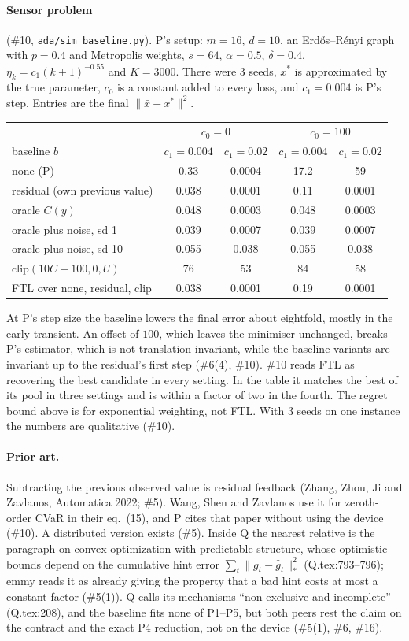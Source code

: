 \documentclass{article}
\begin{document}
\paragraph{Sensor problem} (\#10, \texttt{ada/sim\_baseline.py}). P's
setup: $m=16$, $d=10$, an Erd\H{o}s--R\'enyi graph with $p=0.4$ and
Metropolis weights, $s=64$, $\alpha=0.5$, $\delta=0.4$,
$\eta_k=c_1(k+1)^{-0.55}$ and $K=3000$. There were 3 seeds, $x^*$ is
approximated by the true parameter, $c_0$ is a constant added to every
loss, and $c_1=0.004$ is P's step. Entries are the final
$\|\bar x-x^*\|^2$.
\begin{center}\small
\begin{tabular}{lcccc}
\hline
 & \multicolumn{2}{c}{$c_0=0$} & \multicolumn{2}{c}{$c_0=100$}\\
baseline $b$ & $c_1=0.004$ & $c_1=0.02$ & $c_1=0.004$ & $c_1=0.02$\\
\hline
none (P) & 0.33 & 0.0004 & 17.2 & 59\\
residual (own previous value) & 0.038 & 0.0001 & 0.11 & 0.0001\\
oracle $C(y)$ & 0.048 & 0.0003 & 0.048 & 0.0003\\
oracle plus noise, sd 1 & 0.039 & 0.0007 & 0.039 & 0.0007\\
oracle plus noise, sd 10 & 0.055 & 0.038 & 0.055 & 0.038\\
$\mathrm{clip}(10C+100,0,U)$ & 76 & 53 & 84 & 58\\
FTL over none, residual, clip & 0.038 & 0.0001 & 0.19 & 0.0001\\
\hline
\end{tabular}
\end{center}
At P's step size the baseline lowers the final error about eightfold,
mostly in the early transient. An offset of $100$, which leaves the
minimiser unchanged, breaks P's estimator, which is not translation
invariant, while the baseline variants are invariant up to the residual's
first step (\#6(4), \#10). \#10 reads FTL as recovering the best candidate
in every setting. In the table it matches the best of its pool in three
settings and is within a factor of two in the fourth. The regret bound
above is for exponential weighting, not FTL. With 3 seeds on one instance
the numbers are qualitative (\#10).

\paragraph{Prior art.} Subtracting the previous observed value is residual
feedback (Zhang, Zhou, Ji and Zavlanos, Automatica 2022; \#5). Wang, Shen
and Zavlanos use it for zeroth-order CVaR in their eq.~(15), and P cites
that paper without using the device (\#10). A distributed version exists
(\#5). Inside Q the nearest relative is the paragraph on convex
optimization with predictable structure, whose optimistic bounds depend on
the cumulative hint error $\sum_t\|g_t-\hat g_t\|_*^2$ (Q.tex:793--796);
emmy reads it as already giving the property that a bad hint costs at
most a constant factor (\#5(1)). Q calls its mechanisms ``non-exclusive and
incomplete'' (Q.tex:208), and the baseline fits none of P1--P5, but both
peers rest the claim on the contract and the exact P4 reduction, not on
the device (\#5(1), \#6, \#16).
\end{document}
